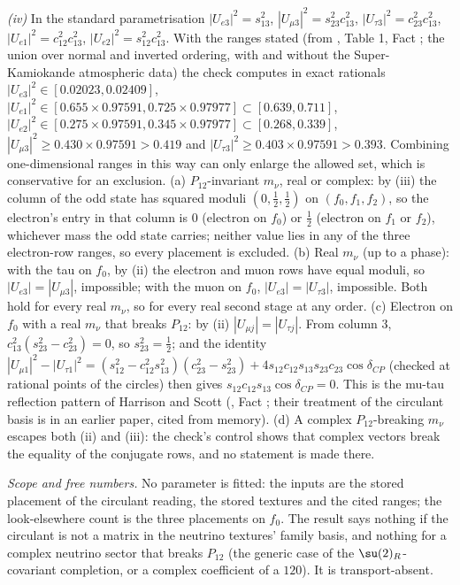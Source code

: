 \emph{(iv)} In the standard parametrisation $|U_{e3}|^{2} = s_{13}^{2}$, $|U_{\mu 3}|^{2} = s_{23}^{2}c_{13}^{2}$, $|U_{\tau 3}|^{2} = c_{23}^{2}c_{13}^{2}$, $|U_{e1}|^{2} = c_{12}^{2}c_{13}^{2}$, $|U_{e2}|^{2} = s_{12}^{2}c_{13}^{2}$. With the ranges stated (from \cite{NuFIT2024}, Table 1, Fact ; the union over normal and inverted ordering, with and without the Super-Kamiokande atmospheric data) the check computes in exact rationals $|U_{e3}|^{2} \in [0.02023, 0.02409]$, $|U_{e1}|^{2} \in [0.655 \times 0.97591, 0.725 \times 0.97977] \subset [0.639, 0.711]$, $|U_{e2}|^{2} \in [0.275 \times 0.97591, 0.345 \times 0.97977] \subset [0.268, 0.339]$, $|U_{\mu 3}|^{2} \ge 0.430 \times 0.97591 > 0.419$ and $|U_{\tau 3}|^{2} \ge 0.403 \times 0.97591 > 0.393$. Combining one-dimensional ranges in this way can only enlarge the allowed set, which is conservative for an exclusion. (a) $P_{12}$-invariant $m_{\nu}$, real or complex: by (iii) the column of the odd state has squared moduli $(0, \tfrac12, \tfrac12)$ on $(f_{0}, f_{1}, f_{2})$, so the electron's entry in that column is $0$ (electron on $f_{0}$) or $\tfrac12$ (electron on $f_{1}$ or $f_{2}$), whichever mass the odd state carries; neither value lies in any of the three electron-row ranges, so every placement is excluded. (b) Real $m_{\nu}$ (up to a phase): with the tau on $f_{0}$, by (ii) the electron and muon rows have equal moduli, so $|U_{e3}| = |U_{\mu 3}|$, impossible; with the muon on $f_{0}$, $|U_{e3}| = |U_{\tau 3}|$, impossible. Both hold for every real $m_{\nu}$, so for every real second stage at any order. (c) Electron on $f_{0}$ with a real $m_{\nu}$ that breaks $P_{12}$: by (ii) $|U_{\mu j}| = |U_{\tau j}|$. From column $3$, $c_{13}^{2}(s_{23}^{2} - c_{23}^{2}) = 0$, so $s_{23}^{2} = \tfrac12$; and the identity $|U_{\mu 1}|^{2} - |U_{\tau 1}|^{2} = (s_{12}^{2} - c_{12}^{2}s_{13}^{2})(c_{23}^{2} - s_{23}^{2}) + 4s_{12}c_{12}s_{13}s_{23}c_{23}\cos\delta_{CP}$ (checked at rational points of the circles) then gives $s_{12}c_{12}s_{13}\cos\delta_{CP} = 0$. This is the mu-tau reflection pattern of Harrison and Scott (\cite{HarrisonScott2002}, Fact ; their treatment of the circulant basis is in an earlier paper, cited from memory). (d) A complex $P_{12}$-breaking $m_{\nu}$ escapes both (ii) and (iii): the check's control shows that complex vectors break the equality of the conjugate rows, and no statement is made there.

\emph{Scope and free numbers.} No parameter is fitted: the inputs are the stored placement of the circulant reading, the stored textures and the cited ranges; the look-elsewhere count is the three placements on $f_{0}$. The result says nothing if the circulant is not a matrix in the neutrino textures' family basis, and nothing for a complex neutrino sector that breaks $P_{12}$ (the generic case of the $\su(2)_{R}$-covariant completion, or a complex coefficient of a $120$). It is transport-absent.
